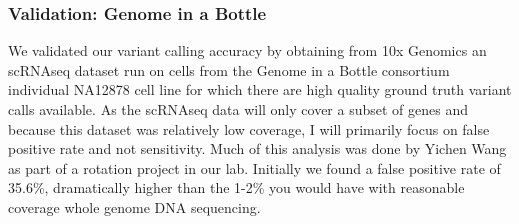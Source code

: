 \subsubsection{Validation: Genome in a Bottle}
\par{
We validated our variant calling accuracy by obtaining from 10x Genomics an scRNAseq dataset run on cells from the Genome in a Bottle consortium individual NA12878 cell line for which there are high quality ground truth variant calls available\cite{giab}. As the scRNAseq data will only cover a subset of genes and because this dataset was relatively low coverage, I will primarily focus on false positive rate and not sensitivity. Much of this analysis was done by Yichen Wang as part of a rotation project in our lab. Initially we found a false positive rate of 35.6\%, dramatically higher than the 1-2\% you would have with reasonable coverage whole genome DNA sequencing.
}


